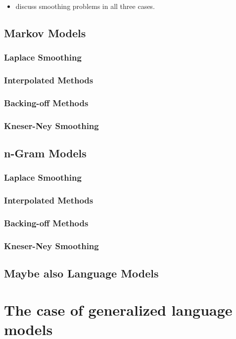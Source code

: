 \documentclass[•]{book}
\begin{document}
\begin{itemize}
\item discuss smoothing problems in all three cases.
\end{itemize}
\section{Markov Models}
\subsection{Laplace Smoothing}
\subsection{Interpolated Methods}
\subsection{Backing-off Methods}
\subsection{Kneser-Ney Smoothing}

\section{n-Gram Models}
\subsection{Laplace Smoothing}
\subsection{Interpolated Methods}
\subsection{Backing-off Methods}
\subsection{Kneser-Ney Smoothing}

\section{Maybe also Language Models}


\chapter{The case of generalized language models}
\end{document}
